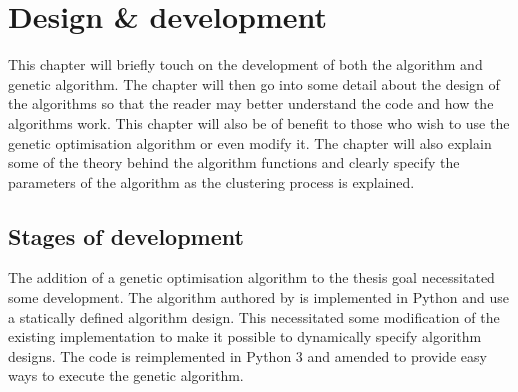 
\chapter{Design \& development} %

\label{DesignDevelopment} %


This chapter will briefly touch on the development of both the \CTC algorithm and genetic algorithm. The chapter will then go into some detail about the design of the algorithms so that the reader may better understand the code and how the algorithms work. This chapter will also be of benefit to those who wish to use the genetic optimisation algorithm or even modify it. The chapter will also explain some of the theory behind the \CTC algorithm functions and clearly specify the parameters of the \CTC algorithm as the clustering process is explained.

\section{Stages of development}
The addition of a genetic optimisation algorithm to the thesis goal necessitated some development. The \CTC algorithm authored by \cite{Moe2014} is implemented in Python and use a statically defined algorithm design. This necessitated some modification of the existing implementation to make it possible to dynamically specify algorithm designs. The code is reimplemented in Python 3 and amended to provide easy ways to execute the genetic algorithm.


